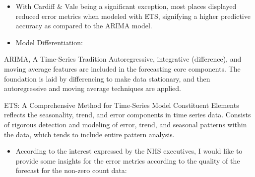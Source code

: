 \documentclass[
]{article}
\providecommand{\tightlist}{%
  \setlength{\itemsep}{0pt}\setlength{\parskip}{0pt}}
\begin{document}
\begin{itemize}
\item
  With Cardiff \& Vale being a significant exception, most places displayed reduced error metrics when modeled with ETS, signifying a higher predictive accuracy as compared to the ARIMA model.
\item
  Model Differentiation:
\end{itemize}

ARIMA, A Time-Series Tradition Autoregressive, integrative (difference), and moving average features are included in the forecasting core components.
The foundation is laid by differencing to make data stationary, and then autoregressive and moving average techniques are applied.

ETS: A Comprehensive Method for Time-Series Model Constituent Elements reflects the seasonality, trend, and error components in time series data. Consists of rigorous detection and modeling of error, trend, and seasonal patterns within the data, which tends to include entire pattern analysis.

\begin{itemize}
\tightlist
\item
  According to the interest expressed by the NHS executives, I would like to provide some insights for the error metrics according to the quality of the forecast for the non-zero count data:
\end{itemize}
\end{document}
